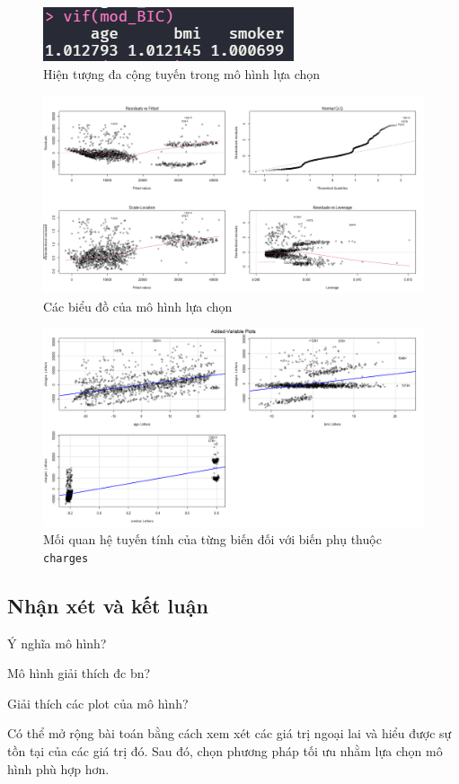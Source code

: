 \begin{figure}[H]
	\centering
	\includegraphics[width=0.35\linewidth]{images/A1/model-bic-vif}
	\caption{Hiện tượng đa cộng tuyến trong mô hình lựa chọn}
	\label{fig-a1:model-bic-vif}
\end{figure}
\begin{figure}[H]
	\centering
	\includegraphics[width=0.8\linewidth]{images/A1/model-bic-plot}
	\caption{Các biểu đồ của mô hình lựa chọn}
	\label{fig-a1:model-bic-plot}
\end{figure}
\begin{figure}[H]
	\centering
	\includegraphics[width=0.8\linewidth]{images/A1/model-bic-vars}
	\caption{Mối quan hệ tuyến tính của từng biến đối với biến phụ thuộc \texttt{charges}}
	\label{fig-a1:model-bic-vars}
\end{figure}


\subsection*{Nhận xét và kết luận}

Ý nghĩa mô hình?

Mô hình giải thích đc bn?

Giải thích các plot của mô hình?

Có thể mở rộng bài toán bằng cách xem xét các giá trị ngoại lai và hiểu được sự tồn tại của các giá trị đó. Sau đó, chọn phương pháp tối ưu nhằm lựa chọn mô hình phù hợp hơn.
